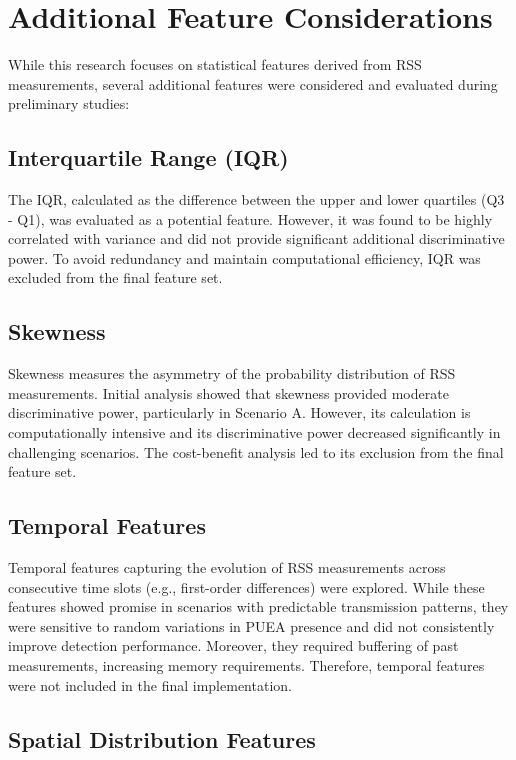 \section{Additional Feature Considerations}

While this research focuses on statistical features derived from RSS measurements, several additional features were considered and evaluated during preliminary studies:

\subsection{Interquartile Range (IQR)}

The IQR, calculated as the difference between the upper and lower quartiles (Q3 - Q1), was evaluated as a potential feature. However, it was found to be highly correlated with variance and did not provide significant additional discriminative power. To avoid redundancy and maintain computational efficiency, IQR was excluded from the final feature set.

\subsection{Skewness}

Skewness measures the asymmetry of the probability distribution of RSS measurements. Initial analysis showed that skewness provided moderate discriminative power, particularly in Scenario A. However, its calculation is computationally intensive and its discriminative power decreased significantly in challenging scenarios. The cost-benefit analysis led to its exclusion from the final feature set.

\subsection{Temporal Features}

Temporal features capturing the evolution of RSS measurements across consecutive time slots (e.g., first-order differences) were explored. While these features showed promise in scenarios with predictable transmission patterns, they were sensitive to random variations in PUEA presence and did not consistently improve detection performance. Moreover, they required buffering of past measurements, increasing memory requirements. Therefore, temporal features were not included in the final implementation.

\subsection{Spatial Distribution Features}

